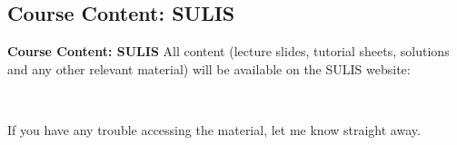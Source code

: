 \documentclass[compress]{beamer}        %
\makeatletter
\newcommand{\tcb}{\textcolor{beamer@blendedblue}}
\makeatother
\begin{document}
\subsection{Course Content: SULIS}
\begin{frame}{\bf \tcb{Course Content: SULIS}}
All content (lecture slides, tutorial sheets, solutions and any other relevant material) will be available on the SULIS website:\\[1cm]

\begin{center}
\boxed{\,\text{\tcb{http://sulis.ul.ie}}\,}\\[1cm]
\end{center}

If you have any trouble accessing the material, let me know straight away.

\end{frame}
\end{document}
